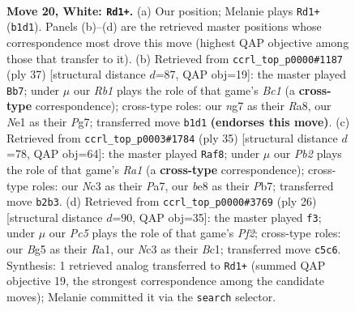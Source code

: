 \documentclass[11pt]{article}
\begin{document}
\clearpage

\begin{figure}[p]\centering
\begin{subfigure}{0.46\textwidth}\centering
\resizebox{\linewidth}{!}{%
\newchessgame
\chessboard[
  setfen={rn2bbr1/1p1k2np/4p1p1/p1P3B1/P1B1P3/2N5/1P3RPP/1R2N1K1 w - - 2 20},
  showmover=false,
  pgfstyle=straightmove, color=movearrow, markmove={b1-d1}
]}
\caption{}
\end{subfigure}\hfill
\begin{subfigure}{0.46\textwidth}\centering
\resizebox{\linewidth}{!}{%
\newchessgame
\chessboard[
  setfen={rnb3k1/p2p2p1/1n2p2p/1P2p3/4P2P/5rP1/1P2NB2/R3KB1R b KQ - 0 19},
  showmover=false,
  pgfstyle=straightmove, color=movearrow, markmove={c8-b7}
]}
\caption{}
\end{subfigure}
\\[4pt]
\begin{subfigure}{0.46\textwidth}\centering
\resizebox{\linewidth}{!}{%
\newchessgame
\chessboard[
  setfen={r6r/pppkn2p/2bpn3/5p2/3P3P/2PN4/PP1N2P1/2K1RB1R b - - 7 18},
  showmover=false,
  pgfstyle=straightmove, color=movearrow, markmove={a8-f8}
]}
\caption{}
\end{subfigure}\hfill
\begin{subfigure}{0.46\textwidth}\centering
\resizebox{\linewidth}{!}{%
\newchessgame
\chessboard[
  setfen={r3kb1r/p4ppp/2p5/2n5/Pp1Nn3/8/1P3PPP/R1BNR1K1 w kq - 2 14},
  showmover=false,
  pgfstyle=straightmove, color=movearrow, markmove={f2-f3}
]}
\caption{}
\end{subfigure}
\caption{\textbf{Move 20, White: \texttt{Rd1+}.} (a) Our position; Melanie plays \texttt{Rd1+} (\texttt{b1d1}). Panels (b)--(d) are the retrieved master positions whose correspondence most drove this move (highest QAP objective among those that transfer to it). (b) Retrieved from \texttt{ccrl\_top\_p0000\#1187} (ply 37) [structural distance $d$=87, QAP obj=19]: the master played \texttt{Bb7}; under $\mu$ our \emph{Rb1} plays the role of that game's \emph{Bc1} (a \textbf{cross-type} correspondence); cross-type roles: our \emph{n}g7 as their \emph{R}a8, our \emph{N}e1 as their \emph{P}g7; transferred move \texttt{b1d1} \textbf{(endorses this move)}. (c) Retrieved from \texttt{ccrl\_top\_p0003\#1784} (ply 35) [structural distance $d$=78, QAP obj=64]: the master played \texttt{Raf8}; under $\mu$ our \emph{Pb2} plays the role of that game's \emph{Ra1} (a \textbf{cross-type} correspondence); cross-type roles: our \emph{N}c3 as their \emph{P}a7, our \emph{b}e8 as their \emph{P}b7; transferred move \texttt{b2b3}. (d) Retrieved from \texttt{ccrl\_top\_p0000\#3769} (ply 26) [structural distance $d$=90, QAP obj=35]: the master played \texttt{f3}; under $\mu$ our \emph{Pc5} plays the role of that game's \emph{Pf2}; cross-type roles: our \emph{B}g5 as their \emph{R}a1, our \emph{N}c3 as their \emph{B}c1; transferred move \texttt{c5c6}. Synthesis: 1 retrieved analog transferred to \texttt{Rd1+} (summed QAP objective 19, the strongest correspondence among the candidate moves); Melanie committed it via the \texttt{search} selector.}
\label{fig:thought-m38}
\end{figure}
\end{document}
